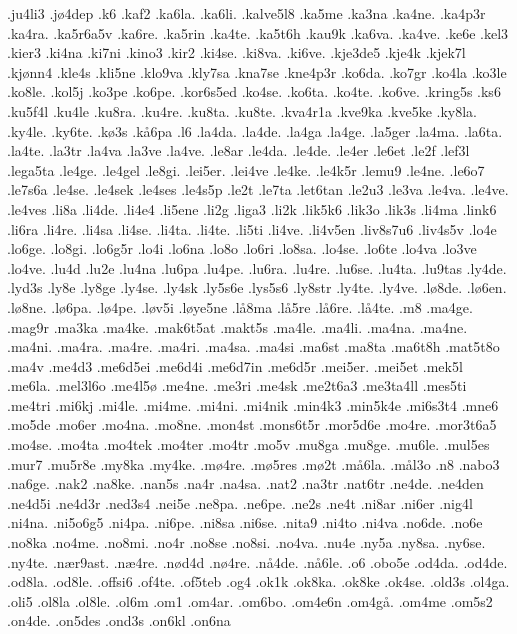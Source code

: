 {.ju4li3
.jø4dep
.k6
.kaf2
.ka6la.
.ka6li.
.kalve5l8
.ka5me
.ka3na
.ka4ne.
.ka4p3r
.ka4ra.
.ka5r6a5v
.ka6re.
.ka5rin
.ka4te.
.ka5t6h
.kau9k
.ka6va.
.ka4ve.
.ke6e
.kel3
.kier3
.ki4na
.ki7ni
.kino3
.kir2
.ki4se.
.ki8va.
.ki6ve.
.kje3de5
.kje4k
.kjek7l
.kjønn4
.kle4s
.kli5ne
.klo9va
.kly7sa
.kna7se
.kne4p3r
.ko6da.
.ko7gr
.ko4la
.ko3le
.ko8le.
.kol5j
.ko3pe
.ko6pe.
.kor6s5ed
.ko4se.
.ko6ta.
.ko4te.
.ko6ve.
.kring5s
.ks6
.ku5f4l
.ku4le
.ku8ra.
.ku4re.
.ku8ta.
.ku8te.
.kva4r1a
.kve9ka
.kve5ke
.ky8la.
.ky4le.
.ky6te.
.kø3s
.kå6pa
.l6
.la4da.
.la4de.
.la4ga
.la4ge.
.la5ger
.la4ma.
.la6ta.
.la4te.
.la3tr
.la4va
.la3ve
.la4ve.
.le8ar
.le4da.
.le4de.
.le4er
.le6et
.le2f
.lef3l
.lega5ta
.le4ge.
.le4gel
.le8gi.
.lei5er.
.lei4ve
.le4ke.
.le4k5r
.lemu9
.le4ne.
.le6o7
.le7s6a
.le4se.
.le4sek
.le4ses
.le4s5p
.le2t
.le7ta
.let6tan
.le2u3
.le3va
.le4va.
.le4ve.
.le4ves
.li8a
.li4de.
.li4e4
.li5ene
.li2g
.liga3
.li2k
.lik5k6
.lik3o
.lik3s
.li4ma
.link6
.li6ra
.li4re.
.li4sa
.li4se.
.li4ta.
.li4te.
.li5ti
.li4ve.
.li4v5en
.liv8s7u6
.liv4s5v
.lo4e
.lo6ge.
.lo8gi.
.lo6g5r
.lo4i
.lo6na
.lo8o
.lo6ri
.lo8sa.
.lo4se.
.lo6te
.lo4va
.lo3ve
.lo4ve.
.lu4d
.lu2e
.lu4na
.lu6pa
.lu4pe.
.lu6ra.
.lu4re.
.lu6se.
.lu4ta.
.lu9tas
.ly4de.
.lyd3s
.ly8e
.ly8ge
.ly4se.
.ly4sk
.ly5s6e
.lys5s6
.ly8str
.ly4te.
.ly4ve.
.lø8de.
.lø6en.
.lø8ne.
.lø6pa.
.lø4pe.
.løv5i
.løye5ne
.lå8ma
.lå5re
.lå6re.
.lå4te.
.m8
.ma4ge.
.mag9r
.ma3ka
.ma4ke.
.mak6t5at
.makt5s
.ma4le.
.ma4li.
.ma4na.
.ma4ne.
.ma4ni.
.ma4ra.
.ma4re.
.ma4ri.
.ma4sa.
.ma4si
.ma6st
.ma8ta
.ma6t8h
.mat5t8o
.ma4v
.me4d3
.me6d5ei
.me6d4i
.me6d7in
.me6d5r
.mei5er.
.mei5et
.mek5l
.me6la.
.mel3l6o
.me4l5ø
.me4ne.
.me3ri
.me4sk
.me2t6a3
.me3ta4ll
.mes5ti
.me4tri
.mi6kj
.mi4le.
.mi4me.
.mi4ni.
.mi4nik
.min4k3
.min5k4e
.mi6s3t4
.mne6
.mo5de
.mo6er
.mo4na.
.mo8ne.
.mon4st
.mons6t5r 
.mor5d6e
.mo4re.
.mor3t6a5
.mo4se.
.mo4ta
.mo4tek
.mo4ter
.mo4tr
.mo5v
.mu8ga
.mu8ge.
.mu6le.
.mul5es
.mur7
.mu5r8e
.my8ka
.my4ke.
.mø4re.
.mø5res
.mø2t
.må6la.
.mål3o
.n8
.nabo3
.na6ge.
.nak2
.na8ke.
.nan5s
.na4r
.na4sa.
.nat2
.na3tr
.nat6tr
.ne4de.
.ne4den
.ne4d5i
.ne4d3r
.ned3s4
.nei5e
.ne8pa.
.ne6pe.
.ne2s
.ne4t
.ni8ar
.ni6er
.nig4l
.ni4na.
.ni5o6g5
.ni4pa.
.ni6pe.
.ni8sa
.ni6se.
.nita9
.ni4to
.ni4va
.no6de.
.no6e
.no8ka
.no4me.
.no8mi.
.no4r
.no8se
.no8si.
.no4va.
.nu4e
.ny5a
.ny8sa.
.ny6se.
.ny4te.
.nær9ast.
.næ4re.
.nød4d
.nø4re.
.nå4de.
.nå6le.
.o6
.obo5e
.od4da.
.od4de.
.od8la.
.od8le.
.offsi6
.of4te.
.of5teb
.og4
.ok1k
.ok8ka.
.ok8ke
.ok4se.
.old3s
.ol4ga.
.oli5
.ol8la
.ol8le.
.ol6m
.om1
.om4ar.
.om6bo.
.om4e6n
.om4gå.
.om4me
.om5s2
.on4de.
.on5des
.ond3s
.on6kl
.on6na
}
